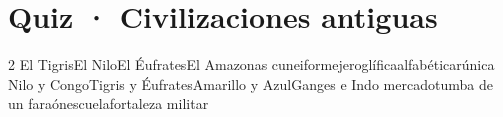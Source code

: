 

\renewcommand{\hdrcapitulo}{Galería · Quiz ICFES}



\section{Quiz · Civilizaciones antiguas}

\begin{evaluacion}[20 minutos]
\begin{multicols}{2}
  {El Tigris}{El Nilo}{El Éufrates}{El Amazonas}
  {cuneiforme}{jeroglífica}{alfabética}{rúnica}
  {Nilo y Congo}{Tigris y Éufrates}{Amarillo y Azul}{Ganges e Indo}
  {mercado}{tumba de un faraón}{escuela}{fortaleza militar}
\end{multicols}
\end{evaluacion}



